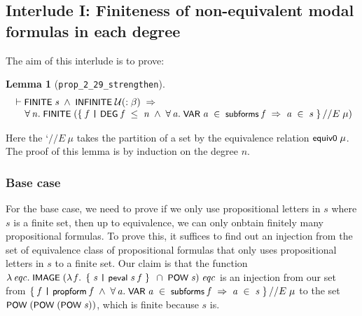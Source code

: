 \documentclass[letterpaper]{article}
\newtheorem{lm}{Lemma}
\renewcommand{\HOLConst}[1]{{\textsf{\upshape\small #1}}}
\renewcommand{\HOLinline}[1]{\ensuremath{#1}}
\newenvironment{holmath}{\begin{displaymath}\begin{array}{l}}{\end{array}\end{displaymath}\ignorespacesafterend}
\begin{document}
\subsection{Interlude I: Finiteness of non-equivalent modal formulas in each degree}

The aim of this interlude is to prove:

\begin{lm}[\texttt{prop_2_29_strengthen}]
\begin{holmath}
  \ensuremath{\HOLTokenTurnstile}\HOLConst{FINITE}\;\HOLFreeVar{s}\;\HOLSymConst{\HOLTokenConj{}}\;\HOLConst{INFINITE}\;\ensuremath{\cal{U}}(:\ensuremath{\beta})\;\HOLSymConst{\HOLTokenImp{}}\\
\;\;\;\;\;\HOLSymConst{\HOLTokenForall{}}\HOLBoundVar{n}.\;\HOLConst{FINITE}\;(\HOLTokenLeftbrace{}\HOLBoundVar{f}\;\HOLTokenBar{}\;\HOLConst{DEG}\;\HOLBoundVar{f}\;\HOLSymConst{\HOLTokenLeq{}}\;\HOLBoundVar{n}\;\HOLSymConst{\HOLTokenConj{}}\;\HOLSymConst{\HOLTokenForall{}}\HOLBoundVar{a}.\;\HOLConst{VAR}\;\HOLBoundVar{a}\;\HOLSymConst{\HOLTokenIn{}}\;\HOLConst{subforms}\;\HOLBoundVar{f}\;\HOLSymConst{\HOLTokenImp{}}\;\HOLBoundVar{a}\;\HOLSymConst{\HOLTokenIn{}}\;\HOLFreeVar{s}\HOLTokenRightbrace{}\HOLSymConst{//E}\;\HOLFreeVar{\ensuremath{\mu}})
\end{holmath}
\end{lm}

Here the `$// E\ \mu$ takes the partition of a set by the equivalence relation \HOLinline{\HOLConst{equiv0}\;\HOLFreeVar{\ensuremath{\mu}}}. The proof of this lemma is by induction on the degree $n$.

\subsubsection{Base case}

For the base case, we need to prove if we only use propositional letters in $s$ where $s$ is a finite set, then up to equivalence, we can only onbtain finitely many propositional formulas. To prove this, it suffices to find out an injection from the set of equivalence class of propositional formulas that only uses propositional letters in $s$ to a finite set. Our claim is that the function 
\HOLinline{\HOLTokenLambda{}\HOLBoundVar{eqc}.\;\HOLConst{IMAGE}\;(\HOLTokenLambda{}\HOLBoundVar{f}.\;\HOLTokenLeftbrace{}\HOLBoundVar{s}\;\HOLTokenBar{}\;\HOLConst{peval}\;\HOLBoundVar{s}\;\HOLBoundVar{f}\HOLTokenRightbrace{}\;\HOLSymConst{\HOLTokenInter{}}\;\HOLConst{POW}\;\HOLFreeVar{s})\;\HOLBoundVar{eqc}} is an injection from our set from \HOLinline{\HOLTokenLeftbrace{}\HOLBoundVar{f}\;\HOLTokenBar{}\;\HOLConst{propform}\;\HOLBoundVar{f}\;\HOLSymConst{\HOLTokenConj{}}\;\HOLSymConst{\HOLTokenForall{}}\HOLBoundVar{a}.\;\HOLConst{VAR}\;\HOLBoundVar{a}\;\HOLSymConst{\HOLTokenIn{}}\;\HOLConst{subforms}\;\HOLBoundVar{f}\;\HOLSymConst{\HOLTokenImp{}}\;\HOLBoundVar{a}\;\HOLSymConst{\HOLTokenIn{}}\;\HOLFreeVar{s}\HOLTokenRightbrace{}\HOLSymConst{//E}\;\HOLFreeVar{\ensuremath{\mu}}} to the set \HOLinline{\HOLConst{POW}\;(\HOLConst{POW}\;(\HOLConst{POW}\;\HOLFreeVar{s}))}, which is finite because $s$ is.
\end{document}
